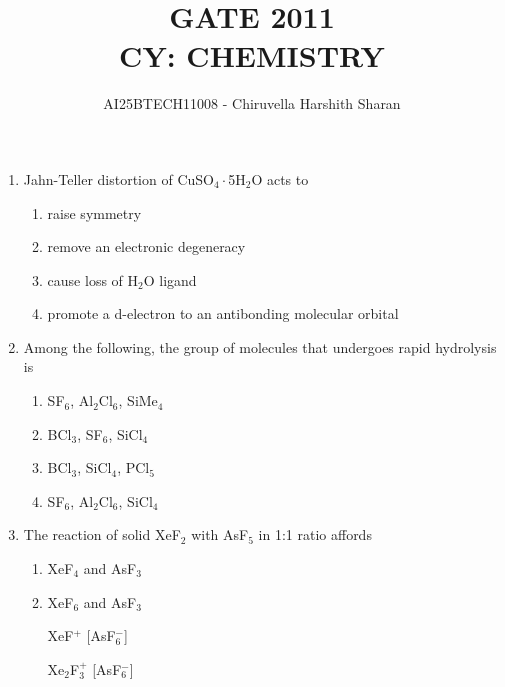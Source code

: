 \documentclass[journal,12pt,onecolumn]{IEEEtran}
\theoremstyle{remark}
\begin{document}
\title{
GATE 2011 \\
CY: CHEMISTRY}
\author{AI25BTECH11008 - Chiruvella Harshith Sharan}
\maketitle


\begin{enumerate}


\item    Jahn-Teller distortion of CuSO$_4\cdot$5H$_2$O acts to \hfill{}
 

\begin{multicols}{2}
\begin{enumerate}
\item raise symmetry  
\item remove an electronic degeneracy  
\item cause loss of H$_2$O ligand  
\item promote a d-electron to an antibonding molecular orbital  
\end{enumerate}
\end{multicols}
 

\item    Among the following, the group of molecules that undergoes rapid hydrolysis is \hfill{}
 

\begin{multicols}{2}
\begin{enumerate}
\item SF$_6$, Al$_2$Cl$_6$, SiMe$_4$  
\item BCl$_3$, SF$_6$, SiCl$_4$  
\item BCl$_3$, SiCl$_4$, PCl$_5$  
\item SF$_6$, Al$_2$Cl$_6$, SiCl$_4$  
\end{enumerate}
\end{multicols}
 

\item    The reaction of solid XeF$_2$ with AsF$_5$ in 1:1 ratio affords \hfill{}
 

\begin{multicols}{2}
\begin{enumerate}
\item XeF$_4$ and AsF$_3$  
\item XeF$_6$ and AsF$_3$  
\item [XeF$^+$][AsF$_6^-$]  
\item [Xe$_2$F$_3^+$][AsF$_6^-$]  
\end{enumerate}
\end{multicols}
 


\end{enumerate}
\end{document}
